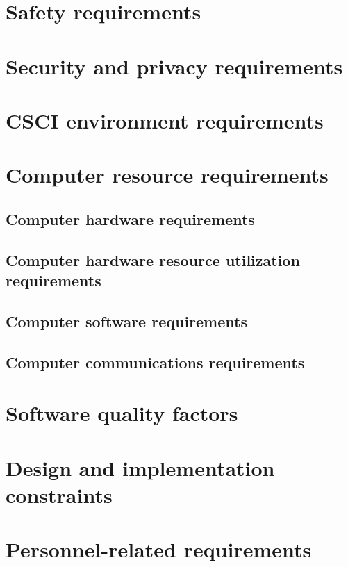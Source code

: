 {\section{Safety requirements}

\section{Security and privacy requirements}

\section{CSCI environment requirements}

\section{Computer resource requirements}

\subsection{Computer hardware requirements}

\subsection{Computer hardware resource utilization requirements}

\subsection{Computer software requirements}

\subsection{Computer communications requirements}

\section{Software quality factors}

\section{Design and implementation constraints}

\section{Personnel-related requirements}

}

